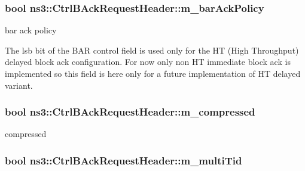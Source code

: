 \subsubsection[{\texorpdfstring{m\+\_\+bar\+Ack\+Policy}{m_barAckPolicy}}]{\setlength{\rightskip}{0pt plus 5cm}bool ns3\+::\+Ctrl\+B\+Ack\+Request\+Header\+::m\+\_\+bar\+Ack\+Policy\hspace{0.3cm}{\ttfamily [private]}}\hypertarget{classns3_1_1CtrlBAckRequestHeader_a44e3acf5aeeb6331ae47a63456e9bea9}{}\label{classns3_1_1CtrlBAckRequestHeader_a44e3acf5aeeb6331ae47a63456e9bea9}


bar ack policy 

The lsb bit of the B\+AR control field is used only for the HT (High Throughput) delayed block ack configuration. For now only non HT immediate block ack is implemented so this field is here only for a future implementation of HT delayed variant. 
\subsubsection[{\texorpdfstring{m\+\_\+compressed}{m_compressed}}]{\setlength{\rightskip}{0pt plus 5cm}bool ns3\+::\+Ctrl\+B\+Ack\+Request\+Header\+::m\+\_\+compressed\hspace{0.3cm}{\ttfamily [private]}}\hypertarget{classns3_1_1CtrlBAckRequestHeader_ad4f7ec69067c22a0008aaf4ed8dac81c}{}\label{classns3_1_1CtrlBAckRequestHeader_ad4f7ec69067c22a0008aaf4ed8dac81c}


compressed 

\subsubsection[{\texorpdfstring{m\+\_\+multi\+Tid}{m_multiTid}}]{\setlength{\rightskip}{0pt plus 5cm}bool ns3\+::\+Ctrl\+B\+Ack\+Request\+Header\+::m\+\_\+multi\+Tid\hspace{0.3cm}{\ttfamily [private]}}\hypertarget{classns3_1_1CtrlBAckRequestHeader_abc49ee1894e62986dcbcf98af884a794}{}\label{classns3_1_1CtrlBAckRequestHeader_abc49ee1894e62986dcbcf98af884a794}



